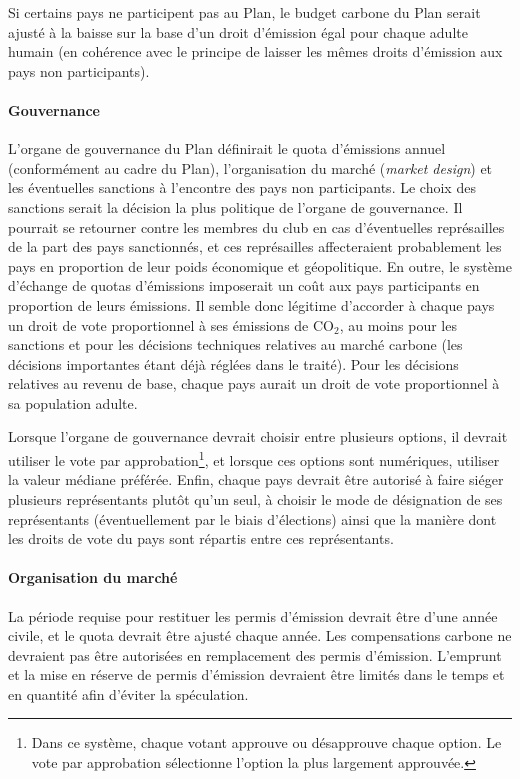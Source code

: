 \documentclass[a5paper,french,openany]{memoir}
\begin{document}
Si certains pays ne participent pas au Plan, le budget carbone du Plan serait ajusté à la baisse sur la base d'un droit d'émission égal pour chaque adulte humain (en cohérence avec le principe de laisser les mêmes droits d'émission aux pays non participants).

\paragraph{Gouvernance} 
L'organe de gouvernance du Plan définirait le quota d'émissions annuel (conformément au cadre du Plan), l'organisation du marché (\textit{market design}) et les éventuelles sanctions à l'encontre des pays non participants. Le choix des sanctions serait la décision la plus politique de l'organe de gouvernance. Il pourrait se retourner contre les membres du club en cas d'éventuelles représailles de la part des pays sanctionnés, et ces représailles affecteraient probablement les pays en proportion de leur poids économique et géopolitique. 
En outre, le système d'échange de quotas d'émissions imposerait un coût aux pays participants en proportion de leurs émissions. Il semble donc légitime d'accorder à chaque pays un droit de vote proportionnel à ses émissions de CO$_\text{2}$, au moins pour les sanctions et pour les décisions techniques relatives au marché carbone (les décisions importantes étant déjà réglées dans le traité). 
Pour les décisions relatives au revenu de base, chaque pays aurait un droit de vote proportionnel à sa population adulte. 

Lorsque l'organe de gouvernance devrait choisir entre plusieurs options, il devrait utiliser le vote par approbation\footnote{Dans ce système, chaque votant approuve ou désapprouve chaque option. Le vote par approbation sélectionne l'option la plus largement approuvée.}, et lorsque ces options sont numériques, utiliser la valeur médiane préférée. Enfin, chaque pays devrait être autorisé à faire siéger plusieurs représentants plutôt qu'un seul, à choisir le mode de désignation de ses représentants (éventuellement par le biais d'élections) ainsi que la manière dont les droits de vote du pays sont répartis entre ces représentants. 


\paragraph{Organisation du marché} 
La période requise pour restituer les permis d'émission devrait être d'une année civile, et le quota devrait être ajusté chaque année. Les compensations carbone ne devraient pas être autorisées en remplacement des permis d'émission. L'emprunt et la mise en réserve de permis d'émission devraient être limités dans le temps et en quantité afin d'éviter la spéculation. %
\end{document}
